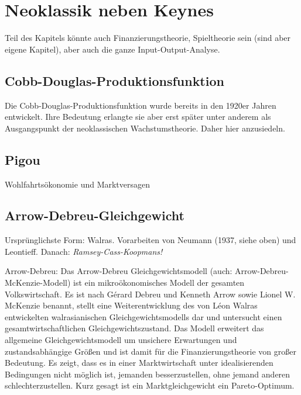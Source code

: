 %
%
%

\chapter{Neoklassik neben Keynes}
\label{Neoklassik_nach1945}

Teil des Kapitels könnte auch Finanzierungstheorie, Spieltheorie sein (sind aber eigene Kapitel), aber auch die ganze Input-Output-Analyse.

\section{Cobb-Douglas-Produktionsfunktion} \label{sec: Cobb-Douglas-Produktionsfunktion}
Die Cobb-Douglas-Produktionsfunktion wurde bereits in den 1920er Jahren entwickelt. Ihre Bedeutung erlangte sie aber erst später unter anderem als Ausgangspunkt der neoklassischen Wachstumstheorie. Daher hier anzusiedeln.




\section{Pigou}
Wohlfahrtsökonomie und Marktversagen


\section{Arrow-Debreu-Gleichgewicht}
\label{Arrow-Debreu}
Ursprünglichste Form: Walras.
Vorarbeiten von Neumann (1937, siehe oben) und Leontieff. Danach: \textit{Ramsey-Cass-Koopmans!}

Arrow-Debreu:
Das Arrow-Debreu Gleichgewichtsmodell (auch: Arrow-Debreu-McKenzie-Modell) ist ein mikroökonomisches Modell der gesamten Volkswirtschaft. Es ist nach Gérard Debreu und Kenneth Arrow sowie Lionel W. McKenzie benannt, stellt eine Weiterentwicklung des von Léon Walras entwickelten walrasianischen Gleichgewichtsmodells dar und untersucht einen gesamtwirtschaftlichen Gleichgewichtszustand. 
Das Modell erweitert das allgemeine Gleichgewichtsmodell um unsichere Erwartungen und zustandsabhängige Größen und ist damit für die Finanzierungstheorie von großer Bedeutung. Es zeigt, dass es in einer Marktwirtschaft unter idealisierenden Bedingungen nicht möglich ist, jemanden besserzustellen, ohne jemand anderen schlechterzustellen. Kurz gesagt ist ein Marktgleichgewicht ein Pareto-Optimum. 



